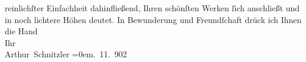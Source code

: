 \begin{ledgroupsized}[t]{13cm}
                    reinlichſter {\pb}Einfachheit dahinfließend,
                    Ihren schönſten Werken ſich anschließt und in noch lichtere Höhen deutet.\pend
           \pstart
           In Bewunderung und Freundſchaft drück ich Ihnen die Hand{\\[\baselineskip]}Ihr{\\[\baselineskip]}\spacefill\mbox{Arthur Schnitzler}\pend
           \leftskip=0em{}. 11. 902\pend
           \endnumbering{}\end{ledgroupsized}  \newcommand{\dateiname}{L01254}\newcommand{\titel}{Arthur Schnitzler an Gerhart Hauptmann, 30. 11. 1902}\newcommand{\editorInnen}{ Martin Anton Müller und Gerd-Hermann Susen}
      